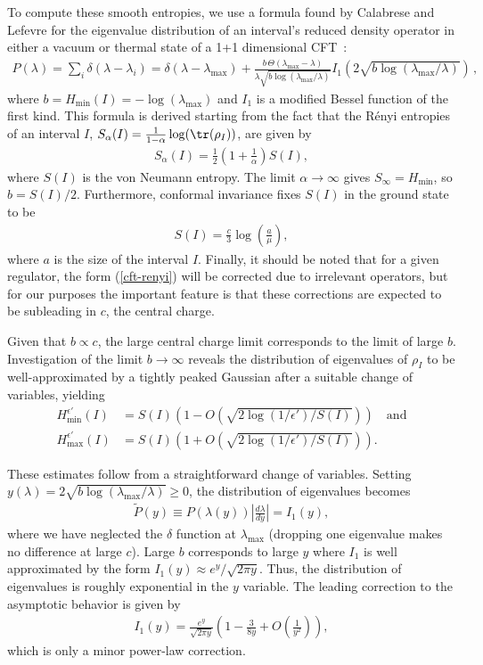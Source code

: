 \documentclass[12pt]{article}
\newcommand{\beq}{\begin{eqnarray}}
\newcommand{\eeq}{\end{eqnarray}}
\newcommand{\Hmax}{H_{\max}}
\newcommand{\Hmin}{H_{\min}}
\newcommand{\lamm}{\lambda_{\max}}
\begin{document}
To compute these smooth entropies, we use a formula found by Calabrese and Lefevre for the eigenvalue distribution of an interval's reduced density operator in either a vacuum or thermal state of a 1+1 dimensional CFT~\cite{calabrese-eigs}:
\beq
P(\lambda) = \sum_i \delta(\lambda - \lambda_i) = \delta(\lambda - \lamm) + \frac{b\, \Theta(\lamm - \lambda)}{\lambda \sqrt{b \log(\lamm/\lambda)}} I_1(2 \sqrt{b\log(\lamm/\lambda)})\,,
\eeq
where $b = \Hmin(I) = -\log(\lambda_{\max})$ and $I_1$ is a modified Bessel function of the first kind. This formula is derived starting from the fact that the R\'enyi entropies of an interval $I$, $S_\alpha(I) = \frac{1}{1-\alpha}\log(\tr(\rho_I))$, are given by
\beq \label{cft-renyi}
S_\alpha(I) = \frac{1}{2}\left(1 +\frac{1}{\alpha}\right) S(I),
\eeq
where $S(I)$ is the von Neumann entropy. The limit $\alpha \rightarrow \infty$ gives $S_\infty = \Hmin$, so $b = S(I)/2$. Furthermore, conformal invariance fixes $S(I)$ in the ground state to be
\beq
S(I) = \frac{c}{3}\log\left(\frac{a}{\mu}\right),
\eeq
where $a$ is the size of the interval $I$. Finally, it should be noted that for a given regulator, the form (\ref{cft-renyi}) will be corrected due to irrelevant operators, but for our purposes the important feature is that these corrections are expected to be subleading in $c$, the central charge.

Given that $b \propto c$, the large central charge limit corresponds to the limit of large $b$. Investigation of the limit $b \rightarrow \infty$ reveals the distribution of eigenvalues of $\rho_I$ to be well-approximated by a tightly peaked Gaussian after a suitable change of variables, yielding\begin{align} \label{eqn:smooths}
\Hmin^{\epsilon'}(I) &= S(I) \left( 1 - O\left( \sqrt{2  \log(1/\epsilon') / S(I)} \right) \right)
	\quad \text{and} \nonumber \\
\Hmax^{\epsilon'}(I) &= S(I) \left( 1 + O\left( \sqrt{2  \log( 1/\epsilon') / S(I)} \right) \right).
\end{align}

These estimates follow from a straightforward change of variables. Setting $y(\lambda) = 2 \sqrt{ b \log(\lamm/\lambda)} \geq 0$, the distribution of eigenvalues becomes
\beq
\tilde{P}(y) \equiv P(\lambda(y)) \left|\frac{d\lambda}{d y}\right| = I_1(y),
\eeq
where we have neglected the $\delta$ function at $\lamm$ (dropping one eigenvalue makes no difference at large $c$). Large $b$ corresponds to large $y$ where $I_1$ is well approximated by the form $I_1(y) \approx e^y/\sqrt{2 \pi y}$. Thus, the distribution of eigenvalues is roughly exponential in the $y$ variable. The leading correction to the asymptotic behavior is given by
\beq
I_1(y) = \frac{e^y}{\sqrt{2\pi y}}\left(1 - \frac{3}{8y} + O\left(\frac{1}{y^2}\right)\right),
\eeq
which is only a minor power-law correction.
\end{document}
